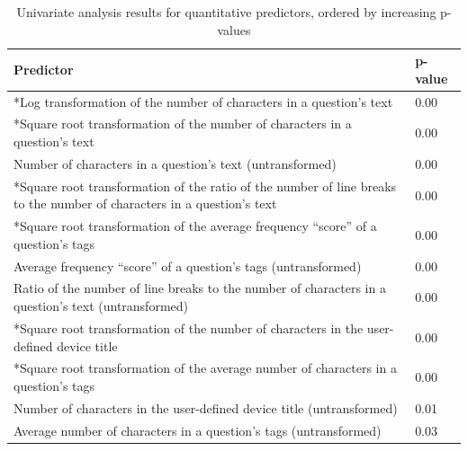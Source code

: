 \documentclass{article}
\begin{document}
\begin{table}[ht]
\centering
\caption{Univariate analysis results for quantitative predictors, ordered by increasing p-values} 
\begin{tabular}{|p{12cm}|p{2cm}|}
  \hline
  Predictor & p-value \\ 
  \hline \hline
  *Log transformation of the number of characters in a question's text & 0.00 \\ 
  \hline
  *Square root transformation of the number of characters in a question's text & 0.00 \\ 
  \hline
  Number of characters in a question's text (untransformed) & 0.00 \\
  \hline
  *Square root transformation of the ratio of the number of line breaks to the number of characters in a question's text & 0.00 \\ 
  \hline
  *Square root transformation of the average frequency ``score'' of a question's tags & 0.00 \\ 
  \hline
  Average frequency ``score'' of a question's tags (untransformed) & 0.00 \\ 
  \hline
  Ratio of the number of line breaks to the number of characters in a question's text (untransformed) & 0.00 \\ 
  \hline
  *Square root transformation of the number of characters in the user-defined device title & 0.00 \\ 
  \hline
  *Square root transformation of the average number of characters in a question's tags & 0.00 \\ 
  \hline
  Number of characters in the user-defined device title (untransformed) & 0.01 \\ 
  \hline
  Average number of characters in a question's tags (untransformed) & 0.03 \\ 
   \hline
\end{tabular}
\label{table:qresults}
\end{table}
\end{document}
